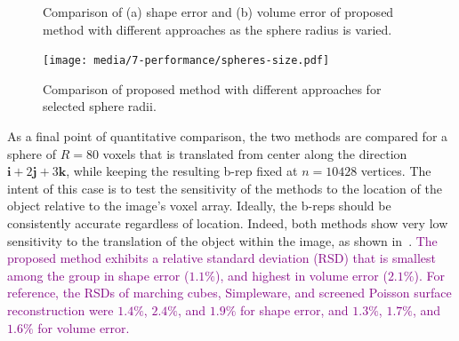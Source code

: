 \begin{figure}[b!]
	\centering
	\caption{Comparison of (a) shape error and (b) volume error of proposed method with different approaches as the sphere radius is varied.}
	\label{fig:graph2}
\end{figure}
\begin{figure}[ht!]
	\centering
	\texttt{[image: media/7-performance/spheres-size.pdf]}
	\caption{Comparison of proposed method with different approaches for selected sphere radii.}
	\label{fig:demos2}
\end{figure}
{\noindent}As a final point of quantitative comparison, the two methods are compared for a sphere of $R = 80$ voxels that is translated from center along the direction $\bm{i}  + 2\bm{j} + 3\bm{k}$, while keeping the resulting b-rep fixed at $n = 10428$ vertices. The intent of this case is to test the sensitivity of the methods to the location of the object relative to the image's voxel array. Ideally, the b-reps should be consistently accurate regardless of location.  Indeed, both methods show very low sensitivity to the translation of the object within the image, as shown in~. \textcolor{purple}{The proposed method exhibits a relative standard deviation (RSD) that is smallest among the group in shape error ($1.1\%$), and highest in volume error ($2.1\%$). For reference, the RSDs of marching cubes, Simpleware, and screened Poisson surface reconstruction were $1.4\%$, $2.4\%$, and $1.9\%$ for shape error, and $1.3\%$, $1.7\%$, and $1.6\%$ for volume error.} \\

